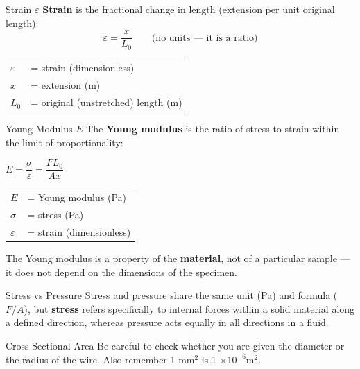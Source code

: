 \begin{definitionbox}{Strain \texorpdfstring{$\varepsilon$}{ε}}
\textbf{Strain} is the fractional change in length (extension per unit original length):
$$\varepsilon = \frac{x}{L_0} \qquad \text{(no units — it is a ratio)}$$
\begin{tabular}{@{}ll@{}}
$\varepsilon$ & = strain (dimensionless) \\
$x$           & = extension (m) \\
$L_0$         & = original (unstretched) length (m) \\
\end{tabular}
\end{definitionbox}

\pagebreak

\begin{formulabox}{Young Modulus \texorpdfstring{$E$}{E}}
The \textbf{Young modulus} is the ratio of stress to strain within the limit of proportionality:
\begin{center}
\Large $E = \dfrac{\sigma}{\varepsilon} = \dfrac{F L_0}{A x}$
\end{center}
\vspace{0.3em}
\begin{tabular}{@{}ll@{}}
$E$ & = Young modulus (Pa) \\
$\sigma$ & = stress (Pa) \\
$\varepsilon$ & = strain (dimensionless) \\
\end{tabular}

\vspace{0.5em}
The Young modulus is a property of the \textbf{material}, not of a particular sample — it does not depend on the dimensions of the specimen.
\end{formulabox}

\begin{warningbox}{Stress vs Pressure}
Stress and pressure share the same unit (Pa) and formula ($F/A$), but \textbf{stress} refers specifically to internal forces within a solid material along a defined direction, whereas pressure acts equally in all directions in a fluid.
\end{warningbox}

\begin{warningbox}{Cross Sectional Area}
Be careful to check whether you are given the diameter or the radius of the wire. Also remember  1  mm$^2$ is 1 $\times 10^{-6}$m$^2$.
\end{warningbox}

